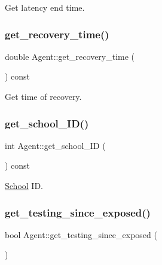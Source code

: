 Get latency end time. 

\mbox{\label{classAgent_a16335c804f8fc6d5dbbfc45e3b1e8276}} 
\subsubsection{\texorpdfstring{get\+\_\+recovery\+\_\+time()}{get\_recovery\_time()}}
{\footnotesize\ttfamily double Agent\+::get\+\_\+recovery\+\_\+time (\begin{DoxyParamCaption}{ }\end{DoxyParamCaption}) const\hspace{0.3cm}{\ttfamily [inline]}}



Get time of recovery. 

\mbox{\label{classAgent_a78c4d92a0f47c27a34f457f492746307}} 
\subsubsection{\texorpdfstring{get\+\_\+school\+\_\+\+I\+D()}{get\_school\_ID()}}
{\footnotesize\ttfamily int Agent\+::get\+\_\+school\+\_\+\+ID (\begin{DoxyParamCaption}{ }\end{DoxyParamCaption}) const\hspace{0.3cm}{\ttfamily [inline]}}



\hyperlink{classSchool}{School} ID. 

\mbox{\label{classAgent_a05506fff0bf91da5ef02c899f3d53fda}} 
\subsubsection{\texorpdfstring{get\+\_\+testing\+\_\+since\+\_\+exposed()}{get\_testing\_since\_exposed()}}
{\footnotesize\ttfamily bool Agent\+::get\+\_\+testing\+\_\+since\+\_\+exposed (\begin{DoxyParamCaption}{ }\end{DoxyParamCaption})\hspace{0.3cm}{\ttfamily [inline]}}

